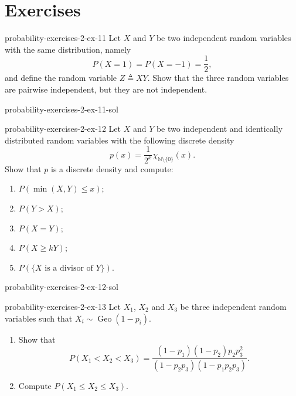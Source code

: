 \documentclass[preview]{standalone}
\begin{document}
\genpage

\section{Exercises}

\begin{snippetexercise}{probability-exercises-2-ex-11}{}
    Let \(X\) and \(Y\) be two independent random variables with the same
    distribution, namely
    \[
        P(X=1) = P(X=-1) = \frac12,
    \]
    and define the random variable \(Z \triangleq XY\). Show that the three random
    variables are pairwise independent, but they are not independent.
\end{snippetexercise}

\begin{snippetsolution}{probability-exercises-2-ex-11-sol}{}
    \todo
\end{snippetsolution}

\begin{snippetexercise}{probability-exercises-2-ex-12}{}
    Let \(X\) and \(Y\) be two independent and identically distributed random
    variables with the following discrete density
    \[
        p(x) = \frac{1}{2^x}\chi_{\mathbb{N}\setminus\{0\}}(x).
    \]
    Show that \(p\) is a discrete density and compute:
    \begin{enumerate}
        \item \(P(\min(X,Y) \leq x)\);
        \item \(P(Y > X)\);
        \item \(P(X = Y)\);
        \item \(P(X \geq kY)\);
        \item \(P(\{X \text{ is a divisor of } Y\})\).
    \end{enumerate}
\end{snippetexercise}

\begin{snippetsolution}{probability-exercises-2-ex-12-sol}{}
    \todo
\end{snippetsolution}

\begin{snippetexercise}{probability-exercises-2-ex-13}{}
    Let \(X_1\), \(X_2\) and \(X_3\) be three independent random variables such that
    \(X_i \sim \operatorname{Geo}(1-p_i)\).
    \begin{enumerate}
        \item Show that
        \[
            P(X_1 < X_2 < X_3)
            =
            \frac{
                (1-p_1)(1-p_2)p_2p_3^2
            }{
                (1-p_2p_3)(1-p_1p_2p_3)
            }.
        \]
        \item Compute \(P(X_1 \leq X_2 \leq X_3)\).
    \end{enumerate}
\end{snippetexercise}
\end{document}
